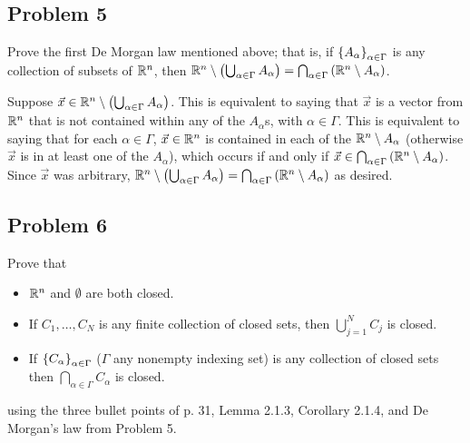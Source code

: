 \documentclass[main.tex]{subfiles}
\begin{document}
\subsection{Problem 5}
\begin{claim}
    Prove the first De Morgan law mentioned above; that is, if $\left\{ A_\alpha \right\}_{\alpha\in\Gamma}$ is any collection of subsets of $\mathbb R^n$, then $\mathbb R^n \setminus \left( \bigcup_{\alpha\in\Gamma}A_\alpha \right) = \bigcap_{\alpha\in\Gamma}\left( \mathbb R^n \setminus A_\alpha \right)$.
\end{claim}

\begin{soln}
    Suppose $\vec{x}\in \mathbb R^n \setminus \left( \bigcup_{\alpha\in\Gamma}A_\alpha \right)$. This is equivalent to saying that $\vec{x}$ is a vector from $\mathbb R^n$ that is not contained within any of the $A_\alpha$s, with $\alpha\in \Gamma$. This is equivalent to saying that for each $\alpha\in \Gamma$, $\vec{x}\in\mathbb R^n$ is contained in each of the $\mathbb R^n\setminus A_\alpha$ (otherwise $\vec{x}$ is in at least one of the $A_\alpha$), which occurs if and only if $\vec{x}\in \bigcap_{\alpha\in\Gamma}\left( \mathbb R^n \setminus A_\alpha \right)$. Since $\vec{x}$ was arbitrary, $\mathbb R^n \setminus \left( \bigcup_{\alpha\in\Gamma}A_\alpha \right) = \bigcap_{\alpha\in\Gamma}\left( \mathbb R^n \setminus A_\alpha \right)$ as desired.
\end{soln}
\eject

\subsection{Problem 6}
\begin{claim}
    Prove that
    \begin{itemize}
        \item $\mathbb R^n$ and $\emptyset$ are both closed.
        \item If $C_1, \ldots , C_N$ is any finite collection of closed sets, then $\bigcup_{j = 1}^N C_j$ is closed.
        \item If $\left\{ C_\alpha \right\}_{\alpha\in \Gamma}$ ($\Gamma$ any nonempty indexing set) is any collection of closed sets then $\bigcap_{\alpha\in\Gamma} C_\alpha$ is closed.
    \end{itemize}
    using the three bullet points of p. 31, Lemma 2.1.3, Corollary 2.1.4, and De Morgan’s law from Problem 5.
\end{claim}
\end{document}
